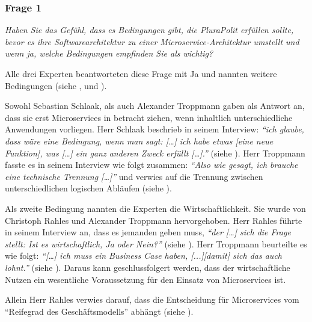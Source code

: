 \subsubsection{Frage 1}
\label{sec:frage1}

\textit{Haben Sie das Gefühl, dass es Bedingungen gibt, die PluraPolit erfüllen sollte, bevor es ihre Softwarearchitektur zu einer Microservice-Architektur umstellt und wenn ja, welche Bedingungen empfinden Sie als wichtig?}

Alle drei Experten beantworteten diese Frage mit Ja und nannten weitere Bedingungen (siehe ,  und ).

Sowohl Sebastian Schlaak, als auch Alexander Troppmann gaben als Antwort an, dass sie erst Microservices in betracht ziehen, wenn inhaltlich unterschiedliche Anwendungen vorliegen. Herr Schlaak beschrieb in seinem Interview: \textit{\enquote{ich glaube, dass wäre eine Bedingung, wenn man sagt: […] ich habe etwas [eine neue Funktion], was […] ein ganz anderen Zweck erfüllt […].}} (siehe ). Herr Troppmann fasste es in seinem Interview wie folgt zusammen:  \textit{\enquote{Also wie gesagt, ich brauche eine technische Trennung […]}} und verwies auf die Trennung zwischen unterschiedlichen logischen Abläufen (siehe ).

Als zweite Bedingung nannten die Experten die Wirtschaftlichkeit. Sie wurde  von Christoph Rahles und Alexander Troppmann hervorgehoben. Herr Rahles führte in seinem Interview an, dass es jemanden geben muss, \textit{\enquote{der […] sich die Frage stellt: Ist es wirtschaftlich, Ja oder Nein?}} (siehe ). Herr Troppmann beurteilte es wie folgt: \textit{\enquote{[…] ich muss ein Business Case haben, [...][damit] sich das auch lohnt.}} (siehe ). Daraus kann geschlussfolgert werden, dass der wirtschaftliche Nutzen ein wesentliche Voraussetzung für den Einsatz von Microservices ist.

Allein Herr Rahles verwies darauf, dass die Entscheidung für Microservices vom “Reifegrad des Geschäftsmodells” abhängt (siehe ).
